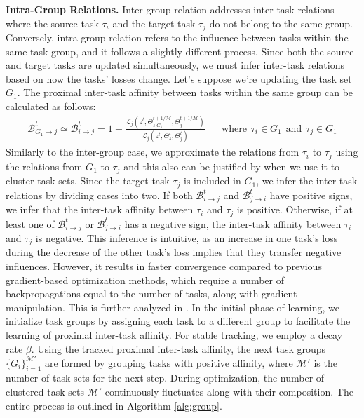 \textbf{Intra-Group Relations.} Inter-group relation addresses inter-task relations where the source task $\tau_i$ and the target task $\tau_j$ do not belong to the same group. Conversely, intra-group relation refers to the influence between tasks within the same task group, and it follows a slightly different process. Since both the source and target tasks are updated simultaneously, we must infer inter-task relations based on how the tasks' losses change. Let's suppose we're updating the task set $G_1$. The proximal inter-task affinity between tasks within the same group can be calculated as follows: 
\begin{align}
    \mathcal{B}^t_{G_1\rightarrow j} \simeq \mathcal{B}^t_{i\rightarrow j} = 1- \frac{\mathcal{L}_j(z^t, \Theta_{s|G_1}^{t+1/\mathcal{M}}, \Theta_j^{t+1/\mathcal{M}})}{\mathcal{L}_j(z^t, \Theta_{s}^{t}, \Theta_j^t)} \hspace{20pt}\text{where}\hspace{5pt} \tau_i\in G_1 \hspace{5pt}\text{and}\hspace{5pt} \tau_j \in G_1
\end{align}
Similarly to the inter-group case, we approximate the relations from $\tau_i$ to $\tau_j$ using the relations from $G_1$ to $\tau_j$ and this also can be justified by  when we use it to cluster task sets. Since the target task $\tau_j$ is included in $G_1$, we infer the inter-task relations by dividing cases into two. If both $\mathcal{B}^t_{i\rightarrow j}$ and $\mathcal{B}^t_{j\rightarrow i}$ have positive signs, we infer that the inter-task affinity between $\tau_i$ and $\tau_j$ is positive. Otherwise, if at least one of $\mathcal{B}^t_{i\rightarrow j}$ or $\mathcal{B}^t_{j\rightarrow i}$ has a negative sign, the inter-task affinity between $\tau_i$ and $\tau_j$ is negative. This inference is intuitive, as an increase in one task's loss during the decrease of the other task's loss implies that they transfer negative influences. However, it results in faster convergence compared to previous gradient-based optimization methods, which require a number of backpropagations equal to the number of tasks, along with gradient manipulation. This is further analyzed in . In the initial phase of learning, we initialize task groups by assigning each task to a different group to facilitate the learning of proximal inter-task affinity. For stable tracking, we employ a decay rate $\beta$. Using the tracked proximal inter-task affinity, the next task groups $\{G_i\}_{i=1}^{\mathcal{M}'}$ are formed by grouping tasks with positive affinity, where $\mathcal{M}'$ is the number of task sets for the next step. During optimization, the number of clustered task sets $\mathcal{M}'$ continuously fluctuates along with their composition. The entire process is outlined in Algorithm \ref{alg:group}.


